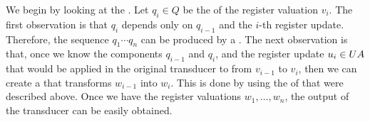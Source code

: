 We begin by looking at the .  Let $q_i \in Q$ be the  of the register valuation $v_i$. The first observation is that $q_i$ depends only on $q_{i-1}$ and the $i$-th register update. Therefore, the sequence $q_1 \cdots q_n$ can be produced by a . The next observation is that, once we know the components $q_{i-1}$ and $q_{i}$, and the register update $u_i \in \functoru A$ that would be applied in the original transducer to from $v_{i-1}$ to $v_i$, then we can create a   that transforms $w_{i-1}$ into $w_i$. This is done by using the  of  that were described above. Once we have the register valuations $w_1,\ldots,w_n$, the output of the transducer can be easily obtained.

